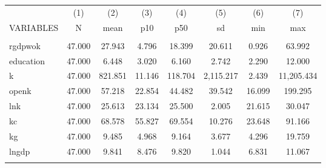 \begin{tabular}{lccccccc} \hline
 & (1) & (2) & (3) & (4) & (5) & (6) & (7) \\
VARIABLES & N & mean & p10 & p50 & sd & min & max \\ \hline
 &  &  &  &  &  &  &  \\
rgdpwok & 47.000 & 27.943 & 4.796 & 18.399 & 20.611 & 0.926 & 63.992 \\
education & 47.000 & 6.448 & 3.020 & 6.160 & 2.742 & 2.290 & 12.000 \\
k & 47.000 & 821.851 & 11.146 & 118.704 & 2,115.217 & 2.439 & 11,205.434 \\
openk & 47.000 & 57.218 & 22.854 & 44.482 & 39.542 & 16.099 & 199.295 \\
lnk & 47.000 & 25.613 & 23.134 & 25.500 & 2.005 & 21.615 & 30.047 \\
kc & 47.000 & 68.578 & 55.827 & 69.554 & 10.276 & 23.648 & 91.166 \\
kg & 47.000 & 9.485 & 4.968 & 9.164 & 3.677 & 4.296 & 19.759 \\
lngdp & 47.000 & 9.841 & 8.476 & 9.820 & 1.044 & 6.831 & 11.067 \\
 &  &  &  &  &  &  &  \\ \hline
\end{tabular}
